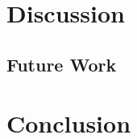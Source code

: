 \documentclass[11pt, a4paper]{article}
\begin{document}
\section{Discussion}
\label{sec:discussion}

%
%
%
%

\subsection{Future Work}

%

\section{Conclusion}
\label{sec:conclusion}
\end{document}
